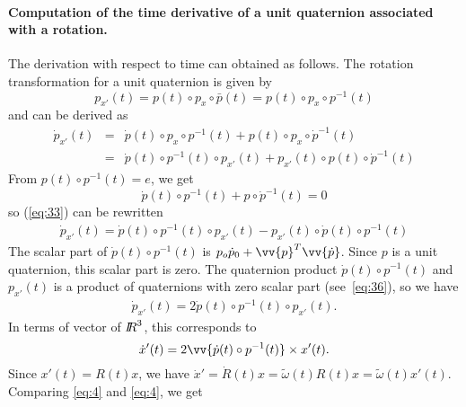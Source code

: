 \paragraph{Computation of the time derivative of a unit  quaternion associated with a rotation.}
The derivation with respect to time can obtained as follows. The rotation transformation for a unit quaternion is given by
\begin{equation}
  \label{eq:33}
  p_{x'}(t) = p(t) \circ p_x \circ \bar p(t) =  p(t) \circ p_x \circ p^{-1}(t)
\end{equation}
and can be derived as
\begin{equation}
  \label{eq:33}
  \begin{array}{lcl}
    \dot p_{x'}(t) &=& \dot p(t) \circ p_x \circ p^{-1}(t) + p(t) \circ p_x \circ \dot p^{-1}(t) \\
                  &=& \dot p(t) \circ p^{-1}(t)  \circ   p_{x'}(t)  +      p_{x'}(t) \circ p(t)  \circ \dot p^{-1}(t)    
  \end{array}
\end{equation}
From $p(t) \circ p^{-1}(t) =e$, we get
\begin{equation}
  \label{eq:34}
  \dot p(t) \circ p^{-1}(t) + p \circ \dot p^{-1}(t) = 0
\end{equation}
so (\ref{eq:33}) can be rewritten
\begin{equation}
  \label{eq:35}
  \begin{array}{lcl}
    \dot p_{x'}(t) = \dot p(t) \circ p^{-1}(t)   \circ   p_{x'}(t)  -    p_{x'}(t) \circ  \dot p(t) \circ p^{-1}(t)
  \end{array}
\end{equation}
The scalar part of $\dot p(t) \circ p^{-1}(t)$ is $p_o \dot p_0 + \vv{p}^T\vv{\dot p}$. Since $p$ is a unit quaternion, this scalar part is zero.
The quaternion product $\dot p(t) \circ p^{-1}(t)$ and  $p_{x'}(t)$ is a product of quaternions with zero scalar part (see~\eqref{eq:36}), so we have 
\begin{equation}
  \label{eq:35}
  \begin{array}{lcl}
    \dot p_{x'}(t) = 2 \dot p(t) \circ p^{-1}(t)   \circ p_{x'}(t).
  \end{array}
\end{equation}
In terms of vector of $\mbox{\rm $I\!\!R$}^3$, this corresponds to
\begin{equation}
  \label{eq:4}
  \dot x'(t) = 2 \vv{ \dot p(t) \circ p^{-1}(t) } \times x'(t).
\end{equation}
Since $x'(t) = R(t) x$, we have $\dot x' = \dot R(t) x = \tilde \omega(t) R(t) x  = \tilde \omega(t) x'(t) $. Comparing \eqref{eq:4} and \eqref{eq:4}, we get
